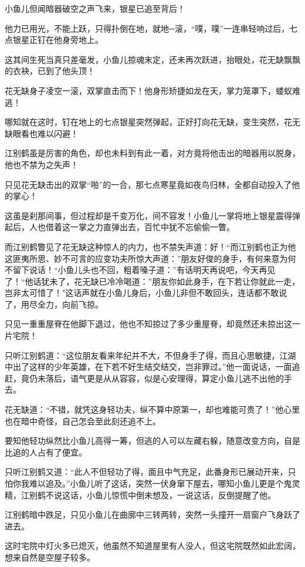 \documentclass[12pt,oneside]{book}
\begin{document}
小鱼儿但闻暗器破空之声飞来，银星已追至背后！

他力已用光，不能上跃，只得扑倒在地，就地─滚，``噗，噗''一连串轻响过后，七点银星正钉在他身旁地上。

这其间生死当真只差毫发，小鱼儿掠魂末定，还未再次跃进，抬眼处，花无缺飘飘的衣袂，已到了他头顶！

花无缺身子凌空一滚，双掌直击而下！他身形矫捷如龙在天，掌力笼罩下，蝼蚁难逃！

哪知就在这时，钉在地上的七点银星突然弹起，正好打向花无缺，变生突然，花无缺眼看也难以闪避！

江别鹤虽是厉害的角色，却也未料到有此一着，对方竟将他击出的暗器用以脱身，他也不禁为之失声！

只见花无缺击出的双掌``啪''的一合，那七点寒星竟如夜鸟归林，全都自动投入了他的掌心！

这虽是刹那间事，但过程却是千变万化，间不容发！小鱼儿一掌将地上银星震得弹起后，人也借着这一掌之力直弹出去，百忙中犹不忘偷偷一瞥。

而江别鹤瞥见了花无缺这种惊人的内力，也不禁失声道：好！``而江别鹤也正为他这匪夷所思、妙不可言的应变功夫所惊大声道：''朋友好俊的身手，有何来意为何不留下说话！``小鱼儿头也不回，粗着嗓子道：''有话明天再说吧，今天再见了！``他话犹未了，花无缺已冷冷喝道：''朋友你如此身手，在下若让你就此一走，岂非太可惜了！"这话声就在小鱼儿身后，小鱼儿非但不敢回头，连话都不敢说了，用尽全力，向前飞掠。

只见一重重屋脊在他脚下退过，他也不知掠过了多少重屋脊，却竟然还未掠出这一片宅院！

只听江别鹤道：``这位朋友看来年纪并不大，不但身手了得，而且心思敏捷，江湖中出了这样的少年英雄，在下若不好生结交结交，岂非罪过。''他一面说话，一面追赶，竟仍未落后，语气更是从从容容，似是心安理得，算定小鱼儿逃不出他的手去。

花无缺道：``不错，就凭这身轻功夫，纵不算中原第一，却也难能可贵了！''他心里也在暗中奇怪，自己怎会至此刻还追不上。

要知他轻功纵然比小鱼儿高得一筹，但逃的人可以左藏右躲，随意改变方向，自是比追的人占有了便宜。

只听江别鹤又道：``此人不但轻功了得，面且中气充足，此番身形已展动开来，只怕你我难以追及。''小鱼儿听了这话，突然一伏身窜下屋去，哪知小鱼儿更是个鬼灵精，江别鹤不说这话，小鱼儿惊慌中倒未想及，一说这话，反倒提醒了他。

江别鹤暗中跌足，只见小鱼儿在曲廓中三转两转，突然一头撞开一扇窗户飞身跃了进去。

这时宅院中灯火多已熄灭，他虽然不知道屋里有人没人，但这宅院既然如此宏阔，想来自然是空屋子较多。
\end{document}
